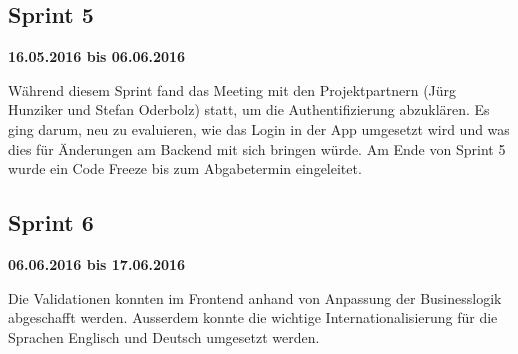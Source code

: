 \subsection{Sprint 5}
\textbf{16.05.2016 bis 06.06.2016}

Während diesem Sprint fand das Meeting mit den Projektpartnern (Jürg Hunziker und Stefan Oderbolz) statt, um die Authentifizierung abzuklären. 
Es ging darum, neu zu evaluieren, wie das Login in der App umgesetzt wird und was dies für Änderungen am Backend mit sich bringen würde. 
Am Ende von Sprint 5 wurde ein Code Freeze bis zum Abgabetermin eingeleitet.

\subsection{Sprint 6}
\textbf{06.06.2016 bis 17.06.2016}

Die Validationen konnten im Frontend anhand von Anpassung der Businesslogik abgeschafft werden.
Ausserdem konnte die wichtige Internationalisierung für die Sprachen Englisch und Deutsch umgesetzt werden. 

